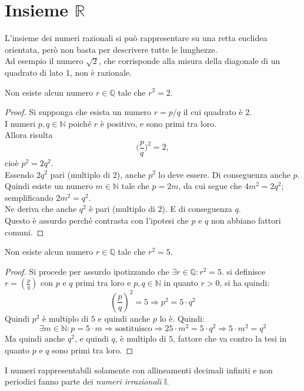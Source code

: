 \documentclass[a4paper,12pt, oneside]{book}
\begin{document}
\section{Insieme $\mathbb{R}$}
L'insieme dei numeri razionali si può rappresentare su una retta euclidea orientata, però non basta per descrivere tutte le lunghezze.\\
Ad esempio il numero $\sqrt{2}$, che corrisponde alla misura della diagonale di un quadrato di lato 1, non è razionale.
\begin{teorema}
	Non esiste alcun numero $r\in\mathbb{Q}$ tale che $r^2=2$.
\end{teorema}
\begin{proof}
	Si supponga che esista un numero $r=p/q$ il cui quadrato è 2.\\
	I numeri $p,q\in\mathbb{N}$ poiché $r$ è positivo, e sono primi tra loro.\\
	Allora risulta
	$$\Big(\frac{p}{q}\Big)^2=2,$$
	cioè $p^2=2q^2$.\\
	Essendo $2q^2$ pari (multiplo di $2$), anche $p^2$ lo deve essere. Di conseguenza anche $p$.\\
	Quindi esiste un numero $m\in\mathbb{N}$ tale che $p=2m$, da cui segue che $4m^2=2q^2$; semplificando $2m^2=q^2$.\\
	Ne deriva che anche $q^2$ è pari (multiplo di $2$). E di conseguenza $q$.\\
	Questo è assurdo perché contrasta con l'ipotesi che $p$ e $q$ non abbiano fattori comuni.
\end{proof}
\begin{teorema}
	Non esiste alcun numero $r\in\mathbb{Q}$ tale che $r^2=5$.
\end{teorema}
\begin{proof}
	Si procede per assurdo ipotizzando che $\exists r\in \mathbb{Q}:r^2=5$.
	si definisce $r=\left(\frac{p}{q}\right)$ con $p$ e $q$ primi tra loro e $p,q\in \mathbb{N}$ in quanto $r>0$, si ha quindi:
	$${\left(\frac{p}{q}\right)}^2=5\Rightarrow p^2=5\cdot q^2$$
	Quindi $p^2$ è multiplo di $5$ e quindi anche $p$ lo è. Quindi:
	$$\exists m\in\mathbb{N}:p=5\cdot m\Rightarrow\mbox{sostituisco}\Rightarrow 25\cdot m^2=5\cdot q^2\Rightarrow 5\cdot m^2=q^2$$
	Ma quindi anche $q^2$, e quindi $q$, è multiplo di $5$, fattore che va contro la tesi in quanto $p$ e $q$ sono primi tra loro.
\end{proof}
I numeri rappresentabili solamente con allineamenti decimali infiniti e non periodici fanno parte dei \emph{numeri irrazionali} $\mathbb{I}$.\\
\end{document}
